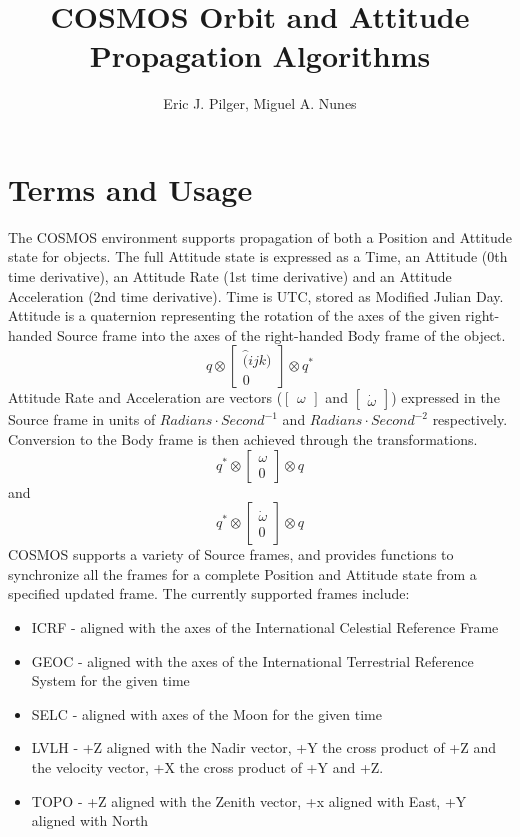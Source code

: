 \documentclass[12pt,letterpaper]{report}
\title{COSMOS Orbit and Attitude Propagation Algorithms}
\author{Eric J. Pilger, Miguel A. Nunes}
\begin{document}
\maketitle
\tableofcontents

\section{Terms and Usage}
The COSMOS environment supports propagation of both a Position and Attitude state for objects. The full Attitude state is expressed as a Time, an Attitude (0th time derivative), an Attitude Rate (1st time derivative) and an Attitude Acceleration (2nd time derivative). Time is UTC, stored as Modified Julian Day. Attitude is a quaternion representing the rotation of the axes of the given right-handed Source frame into the axes of the right-handed Body frame of the object.
\[q \otimes \begin{bmatrix} \hat(ijk)\\0 \end{bmatrix} \otimes q^{*}\]
Attitude Rate and Acceleration are vectors ($\begin{bmatrix}\omega\end{bmatrix}$ and $\begin{bmatrix}\dot{\omega}\end{bmatrix}$) expressed in the Source frame in units of $Radians \cdot Second^{-1}$ and $Radians \cdot Second^{-2}$ respectively. Conversion to the Body frame is then achieved through the transformations.
\[q^{*} \otimes \begin{bmatrix} \omega\\0 \end{bmatrix} \otimes q\] and \[q^{*} \otimes \begin{bmatrix} \dot{\omega}\\0 \end{bmatrix} \otimes q\]
COSMOS supports a variety of Source frames, and provides functions to synchronize all the frames for a complete Position and Attitude state from a specified updated frame. The currently supported frames include:
\begin{itemize}
\item ICRF - aligned with the axes of the International Celestial Reference Frame
\item GEOC - aligned with the axes of the International Terrestrial Reference System for the given time
\item SELC - aligned with axes of the Moon for the given time
\item LVLH - +Z aligned with the Nadir vector, +Y the cross product of +Z and the velocity vector, +X the cross product of +Y and +Z.
\item TOPO - +Z aligned with the Zenith vector, +x aligned with East, +Y aligned with North
\end{itemize}
\end{document}
